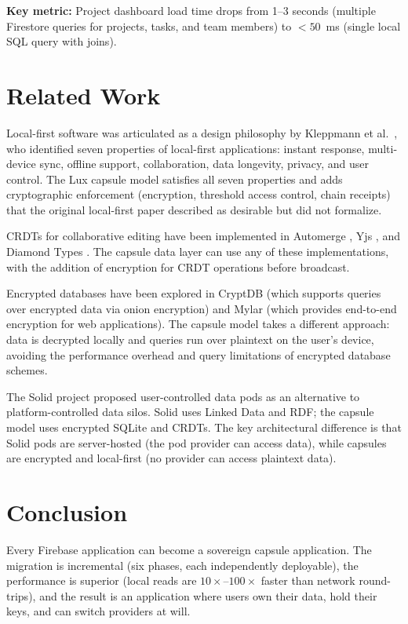 \documentclass[11pt,a4paper]{article}
\begin{document}
\textbf{Key metric:} Project dashboard load time drops from 1--3 seconds
(multiple Firestore queries for projects, tasks, and team members) to
$<50$~ms (single local SQL query with joins).

\section{Related Work}\label{sec:related}

Local-first software was articulated as a design philosophy by Kleppmann
et al.\ \cite{kleppmann2019localfirst}, who identified seven properties
of local-first applications: instant response, multi-device sync, offline
support, collaboration, data longevity, privacy, and user control. The
Lux capsule model satisfies all seven properties and adds cryptographic
enforcement (encryption, threshold access control, chain receipts) that
the original local-first paper described as desirable but did not
formalize.

CRDTs for collaborative editing have been implemented in Automerge
\cite{kleppmann2017automerge}, Yjs \cite{nicolaescu2015yjs}, and
Diamond Types \cite{josephg2023diamond}. The capsule data layer can
use any of these implementations, with the addition of encryption
for CRDT operations before broadcast.

Encrypted databases have been explored in CryptDB \cite{popa2011cryptdb}
(which supports queries over encrypted data via onion encryption) and
Mylar \cite{popa2014mylar} (which provides end-to-end encryption for web
applications). The capsule model takes a different approach: data is
decrypted locally and queries run over plaintext on the user's device,
avoiding the performance overhead and query limitations of encrypted
database schemes.

The Solid project \cite{bernerslee2016solid} proposed user-controlled
data pods as an alternative to platform-controlled data silos. Solid
uses Linked Data and RDF; the capsule model uses encrypted SQLite and
CRDTs. The key architectural difference is that Solid pods are
server-hosted (the pod provider can access data), while capsules are
encrypted and local-first (no provider can access plaintext data).

\section{Conclusion}\label{sec:conclusion}

Every Firebase application can become a sovereign capsule application.
The migration is incremental (six phases, each independently deployable),
the performance is superior (local reads are $10\times$--$100\times$
faster than network round-trips), and the result is an application
where users own their data, hold their keys, and can switch providers
at will.
\end{document}
